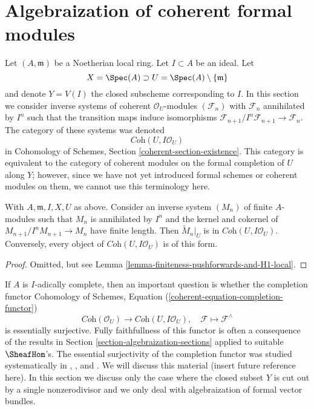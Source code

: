 \section{Algebraization of coherent formal modules}
\label{section-algebraization-modules}

\noindent
Let $(A, \mathfrak m)$ be a Noetherian local ring.
Let $I \subset A$ be an ideal. Let
$$
X = \Spec(A) \supset U = \Spec(A) \setminus \{\mathfrak m\}
$$
and denote $Y = V(I)$ the closed subscheme corresponding to $I$.
In this section we consider inverse systems of coherent
$\mathcal{O}_U$-modules $(\mathcal{F}_n)$ with $\mathcal{F}_n$
annihilated by $I^n$ such that the transition maps induce
isomorphisms $\mathcal{F}_{n + 1}/I^n\mathcal{F}_{n + 1} \to \mathcal{F}_n$.
The category of these systems was denoted
$$
\textit{Coh}(U, I\mathcal{O}_U)
$$
in Cohomology of Schemes, Section \ref{coherent-section-existence}.
This category is equivalent to the category of coherent modules
on the formal completion of $U$ along $Y$; however, since we have
not yet introduced formal schemes or coherent modules on them,
we cannot use this terminology here.

\begin{lemma}
\label{lemma-system-of-modules}
With $A, \mathfrak m, I, X, U$ as above.
Consider an inverse system $(M_n)$ of finite $A$-modules such
that $M_n$ is annihilated by $I^n$ and the kernel and cokernel of
$M_{n + 1}/I^nM_{n + 1} \to M_n$ have finite length.
Then $\widetilde{M}_n|_U$ is in $\textit{Coh}(U, I\mathcal{O}_U)$.
Conversely, every object of $\textit{Coh}(U, I\mathcal{O}_U)$
is of this form.
\end{lemma}

\begin{proof}
Omitted, but see Lemma \ref{lemma-finiteness-pushforwards-and-H1-local}.
\end{proof}

\noindent
If $A$ is $I$-adically complete, then an important question
is whether the completion functor Cohomology of Schemes,
Equation (\ref{coherent-equation-completion-functor})
$$
\textit{Coh}(\mathcal{O}_U)
\longrightarrow
\textit{Coh}(U, I\mathcal{O}_U),\quad
\mathcal{F} \longmapsto \mathcal{F}^\wedge
$$
is essentially surjective. Fully faithfullness of this functor
is often a consequence of the results in
Section \ref{section-algebraization-sections}
applied to suitable $\SheafHom$'s.
The essential surjectivity of the completion functor
was studied systematically in
\cite{SGA2}, \cite{MRaynaud-book}, and \cite{MRaynaud-paper}.
We will discuss this material (insert future reference here).
In this section we discuss only the case where the closed
subset $Y$ is cut out by a single nonzerodivisor and we only
deal with algebraization of formal vector bundles.

